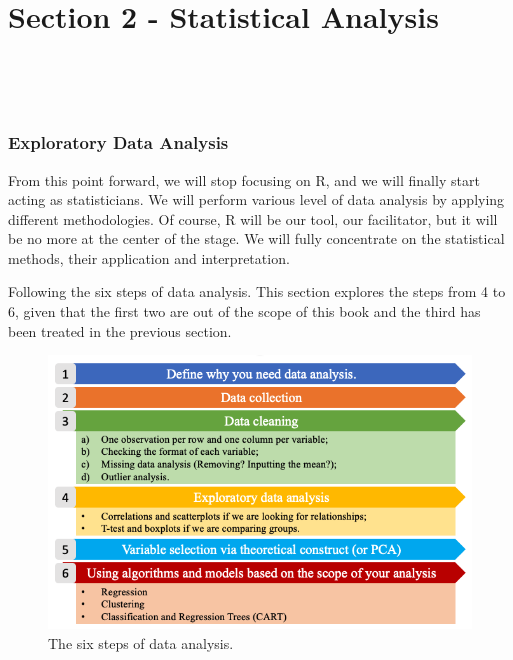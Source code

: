\documentclass[
]{article}
\begin{document}
\pagebreak

~

\pagebreak

\centering

~

~

~

~

\hypertarget{part-section-2---statistical-analysis}{%
\part{Section 2 - Statistical Analysis}\label{part-section-2---statistical-analysis}}

~

~

\hypertarget{exploratory-data-analysis}{%
\section{Exploratory Data Analysis}\label{exploratory-data-analysis}}

\justifying

From this point forward, we will stop focusing on R, and we will finally
start acting as statisticians. We will perform various level of data
analysis by applying different methodologies. Of course, R will be our
tool, our facilitator, but it will be no more at the center of the
stage. We will fully concentrate on the statistical methods, their
application and interpretation.

Following the six steps of data analysis. This section explores the
steps from 4 to 6, given that the first two are out of the scope of this
book and the third has been treated in the previous section.

\begin{figure}[H]

{\centering \includegraphics[width=0.8\linewidth,]{images/Schermata 2022-03-28 alle 10.36.15} 

}

\caption{The six steps of data analysis.}\label{fig:unnamed-chunk-37}
\end{figure}
\end{document}

